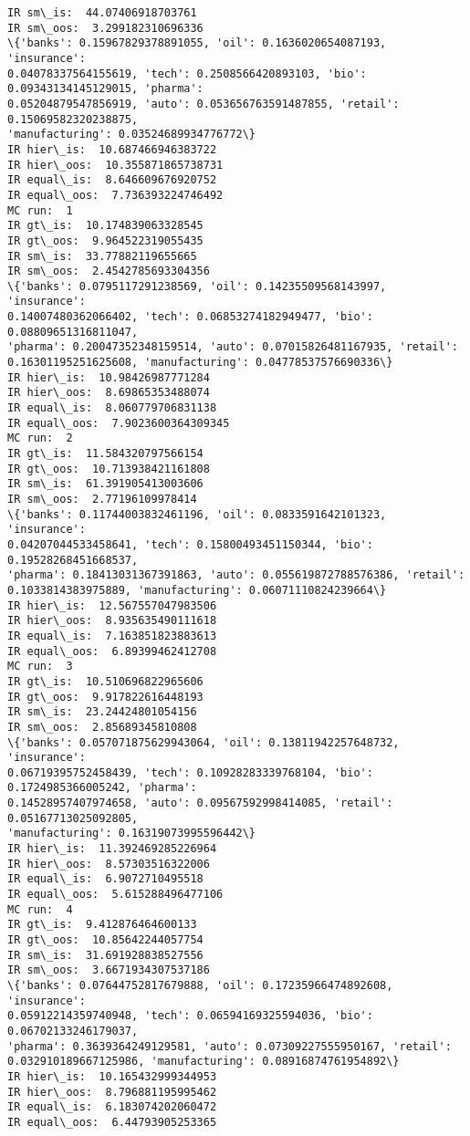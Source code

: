\documentclass[11pt]{article}
\begin{document}
    \begin{Verbatim}[commandchars=\\\{\},fontsize=\footnotesize]
IR sm\_is:  44.07406918703761
IR sm\_oos:  3.299182310696336
\{'banks': 0.15967829378891055, 'oil': 0.1636020654087193, 'insurance':
0.04078337564155619, 'tech': 0.2508566420893103, 'bio': 0.09343134145129015, 'pharma':
0.05204879547856919, 'auto': 0.053656763591487855, 'retail': 0.15069582320238875,
'manufacturing': 0.03524689934776772\}
IR hier\_is:  10.687466946383722
IR hier\_oos:  10.355871865738731
IR equal\_is:  8.646609676920752
IR equal\_oos:  7.736393224746492
MC run:  1
IR gt\_is:  10.174839063328545
IR gt\_oos:  9.964522319055435
IR sm\_is:  33.77882119655665
IR sm\_oos:  2.4542785693304356
\{'banks': 0.0795117291238569, 'oil': 0.14235509568143997, 'insurance':
0.14007480362066402, 'tech': 0.06853274182949477, 'bio': 0.08809651316811047,
'pharma': 0.20047352348159514, 'auto': 0.07015826481167935, 'retail':
0.16301195251625608, 'manufacturing': 0.04778537576690336\}
IR hier\_is:  10.98426987771284
IR hier\_oos:  8.69865353488074
IR equal\_is:  8.060779706831138
IR equal\_oos:  7.9023600364309345
MC run:  2
IR gt\_is:  11.584320797566154
IR gt\_oos:  10.713938421161808
IR sm\_is:  61.391905413003606
IR sm\_oos:  2.77196109978414
\{'banks': 0.11744003832461196, 'oil': 0.0833591642101323, 'insurance':
0.04207044533458641, 'tech': 0.15800493451150344, 'bio': 0.19528268451668537,
'pharma': 0.18413031367391863, 'auto': 0.055619872788576386, 'retail':
0.1033814383975889, 'manufacturing': 0.06071110824239664\}
IR hier\_is:  12.567557047983506
IR hier\_oos:  8.935635490111618
IR equal\_is:  7.163851823883613
IR equal\_oos:  6.89399462412708
MC run:  3
IR gt\_is:  10.510696822965606
IR gt\_oos:  9.917822616448193
IR sm\_is:  23.24424801054156
IR sm\_oos:  2.85689345810808
\{'banks': 0.057071875629943064, 'oil': 0.13811942257648732, 'insurance':
0.06719395752458439, 'tech': 0.10928283339768104, 'bio': 0.1724985366005242, 'pharma':
0.14528957407974658, 'auto': 0.09567592998414085, 'retail': 0.05167713025092805,
'manufacturing': 0.16319073995596442\}
IR hier\_is:  11.392469285226964
IR hier\_oos:  8.57303516322006
IR equal\_is:  6.9072710495518
IR equal\_oos:  5.615288496477106
MC run:  4
IR gt\_is:  9.412876464600133
IR gt\_oos:  10.85642244057754
IR sm\_is:  31.691928838527556
IR sm\_oos:  3.6671934307537186
\{'banks': 0.07644752817679888, 'oil': 0.17235966474892608, 'insurance':
0.05912214359740948, 'tech': 0.06594169325594036, 'bio': 0.06702133246179037,
'pharma': 0.3639364249129581, 'auto': 0.07309227555950167, 'retail':
0.032910189667125986, 'manufacturing': 0.08916874761954892\}
IR hier\_is:  10.165432999344953
IR hier\_oos:  8.796881195995462
IR equal\_is:  6.183074202060472
IR equal\_oos:  6.44793905253365

    \end{Verbatim}
\end{document}
